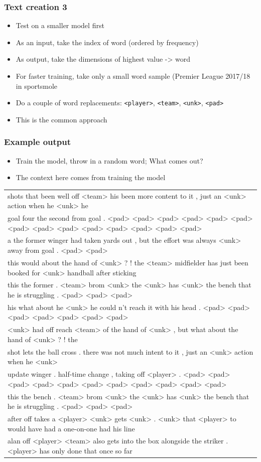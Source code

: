 \documentclass{beamer}
\begin{document}
\begin{frame}
\frametitle{Text creation 3}
\begin{itemize}
\item Test on a smaller model first
\item As an input, take the index of word (ordered by frequency)
\item As output, take the dimensions of highest value -> word
\item For faster training, take only a small word sample (Premier League 2017/18 in sportsmole
\item Do a couple of word replacements: \texttt{<player>}, \texttt{<team>}, \texttt{<unk>}, \texttt{<pad>}
\item This is the common approach
\end{itemize}
\end{frame}

\begin{frame}
\frametitle{Example output}
\begin{itemize}
\item Train the model, throw in a random word; What comes out?
\item The context here comes from training the model
\end{itemize}
\tiny
\begin{tabular}{l}
\hline
shots that been well off <team> his been more content to it , just an <unk> action when he <unk> he\\
goal four the second from goal . <pad> <pad> <pad> <pad> <pad> <pad> <pad> <pad> <pad> <pad> <pad> <pad> <pad> <pad>\\
a the former winger had taken yards out , but the effort was always <unk> away from goal . <pad> <pad>\\
this would about the hand of <unk> ? ! the <team> midfielder has just been booked for <unk> handball after sticking\\
this the former . <team> brom <unk> the <unk> has <unk> the bench that he is struggling . <pad> <pad> <pad>\\
his what about he <unk> he could n't reach it with his head . <pad> <pad> <pad> <pad> <pad> <pad> <pad>\\
<unk> had off reach <team> of the hand of <unk> , but what about the hand of <unk> ? ! the\\
shot lets the ball cross . there was not much intent to it , just an <unk> action when he <unk>\\
update winger . half-time change , taking off <player> . <pad> <pad> <pad> <pad> <pad> <pad> <pad> <pad> <pad> <pad> <pad>\\
this the bench . <team> brom <unk> the <unk> has <unk> the bench that he is struggling . <pad> <pad> <pad>\\
after off takes a <player> <unk> gets <unk> . <unk> that <player> to would have had a one-on-one had his line\\
alan off <player> <team> also gets into the box alongside the striker . <player> has only done that once so far\\\hline
\end{tabular}
\end{frame}
\end{document}
